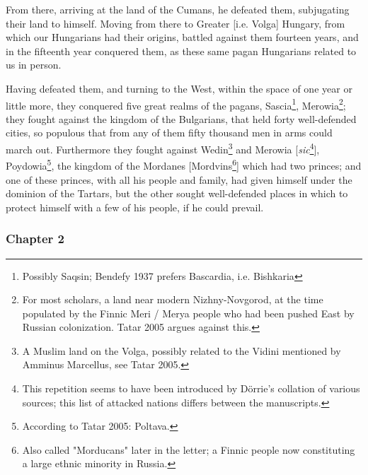 From there, arriving at the land of the Cumans, he defeated them, subjugating their land to himself. Moving from there to Greater [i.e. Volga] Hungary, from which our Hungarians had their origins, battled against them fourteen years, and in the fifteenth year conquered them, as these same pagan Hungarians related to us in person.

Having defeated them, and turning to the West, within the space of one year or little more, they conquered five great realms of the pagans, Sascia\footnote{Possibly Saqsin; Bendefy 1937 prefers Bascardia, i.e. Bishkaria}, Merowia\footnote{For most scholars, a land near modern Nizhny-Novgorod, at the time populated by the Finnic Meri / Merya people who had been pushed East by Russian colonization. Tatar 2005 argues against this.}; they fought against the kingdom of the Bulgarians, that held forty well-defended cities, so populous that from any of them fifty thousand men in arms could march out. Furthermore they fought against Wedin\footnote{A Muslim land on the Volga, possibly related to the Vidini mentioned by Amminus Marcellus, see Tatar 2005.} and Merowia [\emph{sic}\footnote{This repetition seems to have been introduced by Dörrie's collation of various sources; this list of attacked nations differs between the manuscripts.}], Poydowia\footnote{According to Tatar 2005: Poltava.}, the kingdom of the Mordanes [Mordvins\footnote{Also called "Morducans" later in the letter; a Finnic people now constituting a large ethnic minority in Russia.}] which had two princes; and one of these princes, with all his people and family, had given himself under the dominion of the Tartars, but the other sought well-defended places in which to protect himself with a few of his people, if he could prevail.


 

\subsubsection{Chapter 2}

